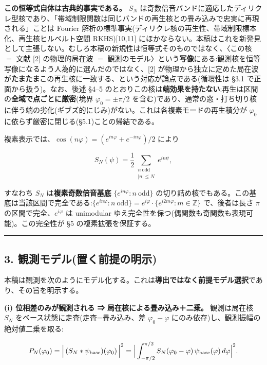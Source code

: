 \documentclass[
]{ltjsarticle}
\begin{document}
\textbf{この恒等式自体は古典的事実である。} \(S_N\)
は奇数倍音バンドに適応したディリクレ型核であり、「帯域制限関数は同じバンドの再生核との畳み込みで忠実に再現される」ことは
Fourier
解析の標準事実(ディリクレ核の再生性、帯域制限標本化、再生核ヒルベルト空間
RKHS){[}10,11{]}
にほかならない。本稿はこれを新発見として主張しない。むしろ本稿の新規性は恒等式そのものではなく、〈この核
\(=\) 文献 {[}2{]} の物理的局在波 \(=\)
観測のモデル〉という\textbf{写像}にある:観測核を恒等写像になるよう人為的に選んだのではなく、{[}2{]}
が物理から独立に定めた局在波が\textbf{たまたま}この再生核に一致する、という対応が論点である(循環性は
§3.1 で正面から扱う)。なお、後述 §4--5
のとおりこの核は\textbf{端効果を持たない}:再生は区間の\textbf{全域で点ごとに厳密}(境界
\(\varphi_0=\pm\pi/2\)
を含む)であり、通常の窓・打ち切り核に伴う端の劣化(ギブズ的にじみ)がない。これは各複素モードの再生積分が
\(\varphi_0\) に依らず厳密に閉じる(§5.1)ことの帰結である。

複素表示では、\(\cos(n\varphi)=(e^{in\varphi}+e^{-in\varphi})/2\) により

\[
S_N(\psi)=\frac12\!\!\sum_{\substack{n\ \text{odd}\\|n|\le N}}\!\! e^{in\psi},
\]

すなわち \(S_N\) は\textbf{複素奇数倍音基底}
\(\{e^{in\varphi}:n\ \text{odd}\}\)
の切り詰め核でもある。この基底は当該区間で完全である:\(\{e^{in\varphi}:n\ \text{odd}\}=e^{i\varphi}\cdot\{e^{i2m\varphi}:m\in\mathbb Z\}\)
で、後者は長さ \(\pi\) の区間で完全、\(e^{i\varphi}\) は unimodular
ゆえ完全性を保つ(偶関数も奇関数も表現可能)。この完全性が §5
の複素拡張を保証する。

\begin{center}\rule{0.5\linewidth}{0.5pt}\end{center}

\subsection{3.
観測モデル(置く前提の明示)}\label{ux89b3ux6e2cux30e2ux30c7ux30ebux7f6eux304fux524dux63d0ux306eux660eux793a}

本稿は観測を次のようにモデル化する。これは\textbf{導出ではなく前提モデル選択}であり、その旨を明示する。

\textbf{(i) 位相差のみが観測される ⇒ 局在核による畳み込み＋二乗。}
観測は局在核 \(S_N\) をベース状態に走査(走査=畳み込み、差
\(\varphi_0-\varphi\) にのみ依存)し、観測振幅の絶対値二乗を取る:

\[
P_N(\varphi_0)=\Big|\,(S_N*\psi_{\rm base})(\varphi_0)\,\Big|^2
=\Big|\int_{-\pi/2}^{\pi/2}S_N(\varphi_0-\varphi)\,\psi_{\rm base}(\varphi)\,d\varphi\Big|^2 .
\]
\end{document}
